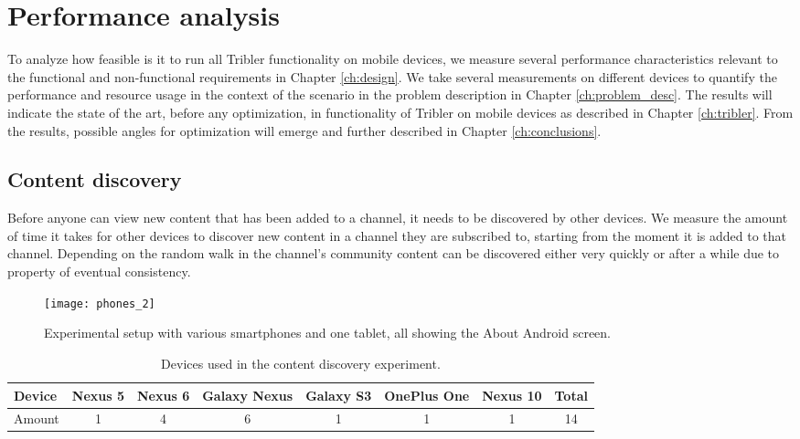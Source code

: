 \chapter{Performance analysis}\label{ch:results}
To analyze how feasible is it to run all Tribler functionality on mobile devices, we measure several performance characteristics relevant to the functional and non-functional requirements in Chapter \ref{ch:design}.
We take several measurements on different devices to quantify the performance and resource usage in the context of the scenario in the problem description in Chapter \ref{ch:problem_desc}.
The results will indicate the state of the art, before any optimization, in functionality of Tribler on mobile devices as described in Chapter \ref{ch:tribler}.
From the results, possible angles for optimization will emerge and further described in Chapter \ref{ch:conclusions}.


\section{Content discovery}\label{sec:content_discovery}
Before anyone can view new content that has been added to a channel, it needs to be discovered by other devices.
We measure the amount of time it takes for other devices to discover new content in a channel they are subscribed to, starting from the moment it is added to that channel.
Depending on the random walk in the channel's community content can be discovered either very quickly or after a while due to property of eventual consistency.
\begin{figure}[H]
	\centering
	\texttt{[image: phones\_2]}
	\caption{Experimental setup with various smartphones and one tablet, all showing the About Android screen.}
	\label{fig:phones_2}
\end{figure}

\begin{table}[H]
	\begin{tabular}{l | *{6}{c} || c} \hline
		Device & Nexus 5 & Nexus 6 & Galaxy Nexus & Galaxy S3 & OnePlus One & Nexus 10 & Total \\ \hline
		Amount & 1 & 4 & 6 & 1 & 1 & 1 & 14 \\ \hline
	\end{tabular}
	\caption{Devices used in the content discovery experiment.}
	\label{table:devices}
\end{table}

